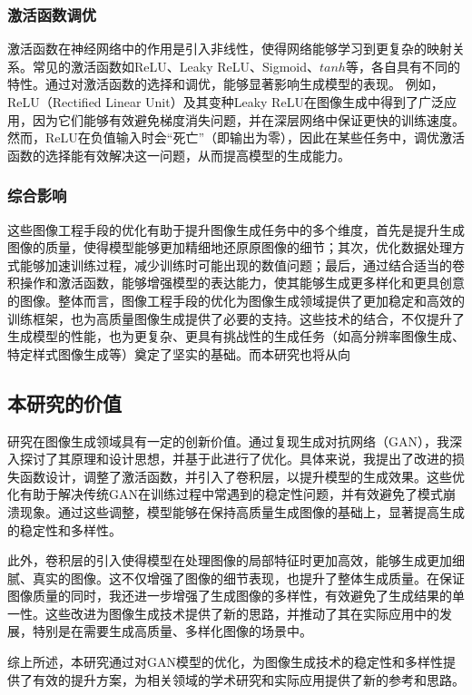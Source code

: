 \documentclass[UTF8]{ctexart}
\begin{document}
\subsubsection{激活函数调优}
激活函数在神经网络中的作用是引入非线性，使得网络能够学习到更复杂的映射关系。常见的激活函数如ReLU、Leaky ReLU、Sigmoid、$tanh$等，各自具有不同的特性。通过对激活函数的选择和调优，能够显著影响生成模型的表现。
例如，ReLU（Rectified Linear Unit）及其变种Leaky ReLU在图像生成中得到了广泛应用，因为它们能够有效避免梯度消失问题，并在深层网络中保证更快的训练速度。然而，ReLU在负值输入时会“死亡”（即输出为零），因此在某些任务中，调优激活函数的选择能有效解决这一问题，从而提高模型的生成能力。

\subsubsection{综合影响}
这些图像工程手段的优化有助于提升图像生成任务中的多个维度，首先是提升生成图像的质量，使得模型能够更加精细地还原原图像的细节；其次，优化数据处理方式能够加速训练过程，减少训练时可能出现的数值问题；最后，通过结合适当的卷积操作和激活函数，能够增强模型的表达能力，使其能够生成更多样化和更具创意的图像。整体而言，图像工程手段的优化为图像生成领域提供了更加稳定和高效的训练框架，也为高质量图像生成提供了必要的支持。这些技术的结合，不仅提升了生成模型的性能，也为更复杂、更具有挑战性的生成任务（如高分辨率图像生成、特定样式图像生成等）奠定了坚实的基础。而本研究也将从向


\subsection{本研究的价值}

研究在图像生成领域具有一定的创新价值。通过复现生成对抗网络（GAN），我深入探讨了其原理和设计思想，并基于此进行了优化。具体来说，我提出了改进的损失函数设计，调整了激活函数，并引入了卷积层，以提升模型的生成效果。这些优化有助于解决传统GAN在训练过程中常遇到的稳定性问题，并有效避免了模式崩溃现象。通过这些调整，模型能够在保持高质量生成图像的基础上，显著提高生成的稳定性和多样性。\par
此外，卷积层的引入使得模型在处理图像的局部特征时更加高效，能够生成更加细腻、真实的图像。这不仅增强了图像的细节表现，也提升了整体生成质量。在保证图像质量的同时，我还进一步增强了生成图像的多样性，有效避免了生成结果的单一性。这些改进为图像生成技术提供了新的思路，并推动了其在实际应用中的发展，特别是在需要生成高质量、多样化图像的场景中。\par
综上所述，本研究通过对GAN模型的优化，为图像生成技术的稳定性和多样性提供了有效的提升方案，为相关领域的学术研究和实际应用提供了新的参考和思路。
\end{document}

